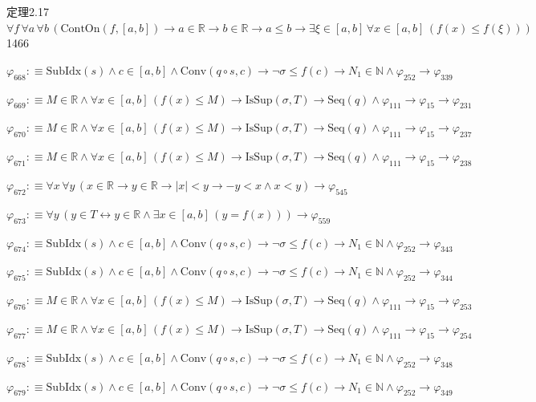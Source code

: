 \begin{fullproof}{定理2.17}{$\forall f\,\forall a\,\forall b\,(\mathrm{ContOn}(f,[a,b]) \to a \in \mathbb{R} \to b \in \mathbb{R} \to a \leq b \to \exists \xi \in [a,b]\,\forall x \in [a,b]\,(f(x) \leq f(\xi)))$}{1466}
\begin{abbrevlist}
\item $\varphi_{668} :\equiv \mathrm{SubIdx}(s) \land c \in [a,b] \land \mathrm{Conv}(q \circ s,c) \to \neg \sigma \leq f(c) \to N_{1} \in \mathbb{N} \land \varphi_{252} \to \varphi_{339}$
\item $\varphi_{669} :\equiv M \in \mathbb{R} \land \forall x \in [a,b]\,(f(x) \leq M) \to \mathrm{IsSup}(\sigma,T) \to \mathrm{Seq}(q) \land \varphi_{111} \to \varphi_{15} \to \varphi_{231}$
\item $\varphi_{670} :\equiv M \in \mathbb{R} \land \forall x \in [a,b]\,(f(x) \leq M) \to \mathrm{IsSup}(\sigma,T) \to \mathrm{Seq}(q) \land \varphi_{111} \to \varphi_{15} \to \varphi_{237}$
\item $\varphi_{671} :\equiv M \in \mathbb{R} \land \forall x \in [a,b]\,(f(x) \leq M) \to \mathrm{IsSup}(\sigma,T) \to \mathrm{Seq}(q) \land \varphi_{111} \to \varphi_{15} \to \varphi_{238}$
\item $\varphi_{672} :\equiv \forall x\,\forall y\,(x \in \mathbb{R} \to y \in \mathbb{R} \to \lvert x \rvert < y \to -y < x \land x < y) \to \varphi_{545}$
\item $\varphi_{673} :\equiv \forall y\,(y \in T \leftrightarrow y \in \mathbb{R} \land \exists x \in [a,b]\,(y = f(x))) \to \varphi_{559}$
\item $\varphi_{674} :\equiv \mathrm{SubIdx}(s) \land c \in [a,b] \land \mathrm{Conv}(q \circ s,c) \to \neg \sigma \leq f(c) \to N_{1} \in \mathbb{N} \land \varphi_{252} \to \varphi_{343}$
\item $\varphi_{675} :\equiv \mathrm{SubIdx}(s) \land c \in [a,b] \land \mathrm{Conv}(q \circ s,c) \to \neg \sigma \leq f(c) \to N_{1} \in \mathbb{N} \land \varphi_{252} \to \varphi_{344}$
\item $\varphi_{676} :\equiv M \in \mathbb{R} \land \forall x \in [a,b]\,(f(x) \leq M) \to \mathrm{IsSup}(\sigma,T) \to \mathrm{Seq}(q) \land \varphi_{111} \to \varphi_{15} \to \varphi_{253}$
\item $\varphi_{677} :\equiv M \in \mathbb{R} \land \forall x \in [a,b]\,(f(x) \leq M) \to \mathrm{IsSup}(\sigma,T) \to \mathrm{Seq}(q) \land \varphi_{111} \to \varphi_{15} \to \varphi_{254}$
\item $\varphi_{678} :\equiv \mathrm{SubIdx}(s) \land c \in [a,b] \land \mathrm{Conv}(q \circ s,c) \to \neg \sigma \leq f(c) \to N_{1} \in \mathbb{N} \land \varphi_{252} \to \varphi_{348}$
\item $\varphi_{679} :\equiv \mathrm{SubIdx}(s) \land c \in [a,b] \land \mathrm{Conv}(q \circ s,c) \to \neg \sigma \leq f(c) \to N_{1} \in \mathbb{N} \land \varphi_{252} \to \varphi_{349}$

\end{abbrevlist}
\end{fullproof}
